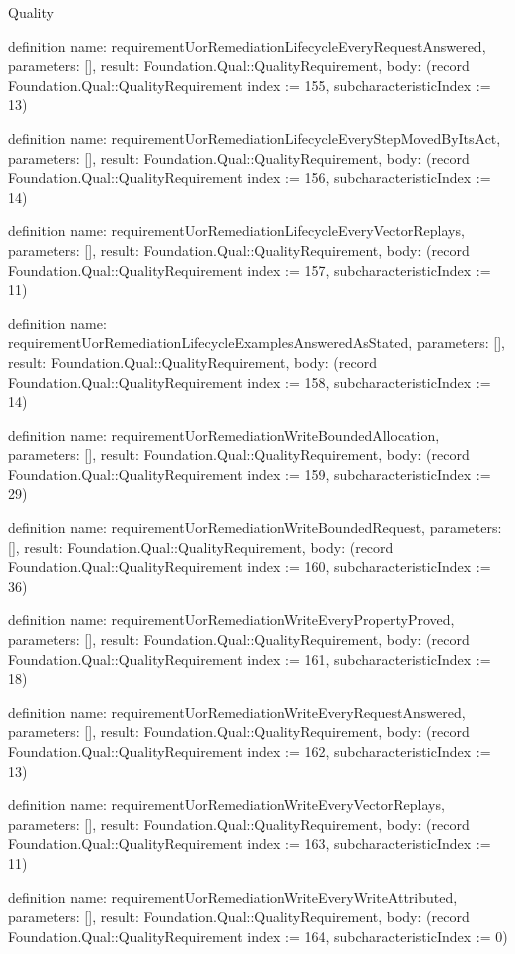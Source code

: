 \begin{lexlean}{Quality}
\begin{semanticmodule}
definition{
  name: requirementUorRemediationLifecycleEveryRequestAnswered,
  parameters: [],
  result: Foundation.Qual::QualityRequirement,
  body: (record Foundation.Qual::QualityRequirement {index := 155, subcharacteristicIndex := 13})
}

definition{
  name: requirementUorRemediationLifecycleEveryStepMovedByItsAct,
  parameters: [],
  result: Foundation.Qual::QualityRequirement,
  body: (record Foundation.Qual::QualityRequirement {index := 156, subcharacteristicIndex := 14})
}

definition{
  name: requirementUorRemediationLifecycleEveryVectorReplays,
  parameters: [],
  result: Foundation.Qual::QualityRequirement,
  body: (record Foundation.Qual::QualityRequirement {index := 157, subcharacteristicIndex := 11})
}

definition{
  name: requirementUorRemediationLifecycleExamplesAnsweredAsStated,
  parameters: [],
  result: Foundation.Qual::QualityRequirement,
  body: (record Foundation.Qual::QualityRequirement {index := 158, subcharacteristicIndex := 14})
}

definition{
  name: requirementUorRemediationWriteBoundedAllocation,
  parameters: [],
  result: Foundation.Qual::QualityRequirement,
  body: (record Foundation.Qual::QualityRequirement {index := 159, subcharacteristicIndex := 29})
}

definition{
  name: requirementUorRemediationWriteBoundedRequest,
  parameters: [],
  result: Foundation.Qual::QualityRequirement,
  body: (record Foundation.Qual::QualityRequirement {index := 160, subcharacteristicIndex := 36})
}

definition{
  name: requirementUorRemediationWriteEveryPropertyProved,
  parameters: [],
  result: Foundation.Qual::QualityRequirement,
  body: (record Foundation.Qual::QualityRequirement {index := 161, subcharacteristicIndex := 18})
}

definition{
  name: requirementUorRemediationWriteEveryRequestAnswered,
  parameters: [],
  result: Foundation.Qual::QualityRequirement,
  body: (record Foundation.Qual::QualityRequirement {index := 162, subcharacteristicIndex := 13})
}

definition{
  name: requirementUorRemediationWriteEveryVectorReplays,
  parameters: [],
  result: Foundation.Qual::QualityRequirement,
  body: (record Foundation.Qual::QualityRequirement {index := 163, subcharacteristicIndex := 11})
}

definition{
  name: requirementUorRemediationWriteEveryWriteAttributed,
  parameters: [],
  result: Foundation.Qual::QualityRequirement,
  body: (record Foundation.Qual::QualityRequirement {index := 164, subcharacteristicIndex := 0})
}


\end{semanticmodule}
\end{lexlean}
